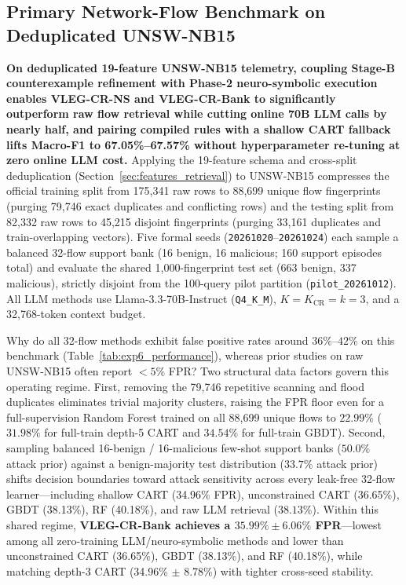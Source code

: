 \documentclass[11pt,letterpaper,onecolumn]{article}
\begin{document}
\subsection{Primary Network-Flow Benchmark on Deduplicated UNSW-NB15}
\label{sec:exp6}
\textbf{On deduplicated 19-feature UNSW-NB15 telemetry, coupling Stage-B counterexample refinement with Phase-2 neuro-symbolic execution enables VLEG-CR-NS and VLEG-CR-Bank to significantly outperform raw flow retrieval while cutting online 70B LLM calls by nearly half, and pairing compiled rules with a shallow CART fallback lifts Macro-F1 to 67.05\%--67.57\% without hyperparameter re-tuning at zero online LLM cost.} Applying the 19-feature schema and cross-split deduplication (Section~\ref{sec:features_retrieval}) to UNSW-NB15 compresses the official training split from 175,341 raw rows to 88,699 unique flow fingerprints (purging 79,746 exact duplicates and conflicting rows) and the testing split from 82,332 raw rows to 45,215 disjoint fingerprints (purging 33,161 duplicates and train-overlapping vectors). Five formal seeds (\texttt{20261020}--\texttt{20261024}) each sample a balanced 32-flow support bank (16 benign, 16 malicious; 160 support episodes total) and evaluate the shared 1,000-fingerprint test set (663 benign, 337 malicious), strictly disjoint from the 100-query pilot partition (\texttt{pilot\_20261012}). All LLM methods use Llama-3.3-70B-Instruct (\texttt{Q4\_K\_M}), $K = K_{\mathrm{CR}} = k = 3$, and a 32,768-token context budget.

Why do all 32-flow methods exhibit false positive rates around $36\%$--$42\%$ on this benchmark (Table~\ref{tab:exp6_performance}), whereas prior studies on raw UNSW-NB15 often report $<5\%$ FPR? Two structural data factors govern this operating regime. First, removing the 79,746 repetitive scanning and flood duplicates eliminates trivial majority clusters, raising the FPR floor even for a full-supervision Random Forest trained on all 88,699 unique flows to $22.99\%$ ($31.98\%$ for full-train depth-5 CART and $34.54\%$ for full-train GBDT). Second, sampling balanced 16-benign / 16-malicious few-shot support banks ($50.0\%$ attack prior) against a benign-majority test distribution ($33.7\%$ attack prior) shifts decision boundaries toward attack sensitivity across every leak-free 32-flow learner---including shallow CART (34.96\% FPR), unconstrained CART (36.65\%), GBDT (38.13\%), RF (40.18\%), and raw LLM retrieval ($38.13\%$). Within this shared regime, \textbf{VLEG-CR-Bank achieves a $35.99\% \pm 6.06\%$ FPR}---lowest among all zero-training LLM/neuro-symbolic methods and lower than unconstrained CART (36.65\%), GBDT (38.13\%), and RF (40.18\%), while matching depth-3 CART (34.96\% $\pm$ 8.78\%) with tighter cross-seed stability.
\end{document}

